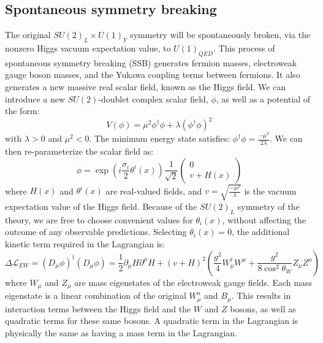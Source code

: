 \subsection{Spontaneous symmetry breaking}\label{subsec:ew_higgs}

The original $SU(2)_{L}\times U(1)_Y$ symmetry will be spontaneously broken, via the nonzero Higgs vacuum expectation value, to $U(1)_{QED}$.
This process of spontaneous symmetry breaking (SSB) generates fermion masses, electroweak gauge boson masses,
and the Yukawa coupling terms between fermions.
It also generates a new massive real scalar field, known as the Higgs field.
We can introduce a new $SU(2)$-doublet complex scalar field, $\phi$, as well as a potential of the form:
\begin{equation}\label{eq:higgs_potential}
    V(\phi) = \mu^2 \phi^\dagger\phi + \lambda(\phi^\dagger\phi)^2
\end{equation}
with $\lambda > 0$ and $\mu^2 <0$.
The minimum energy state satisfies: $\phi^\dagger\phi = \frac{-\mu^2}{2\lambda}$.
We can then re-parameterize the scalar field as:
\begin{equation}\label{eq:higgs_param}
    \phi = \exp{\left(i\frac{\sigma_i}{2}\theta^i(x)\right)}\frac{1}{\sqrt{2}}\begin{pmatrix} 0 \\ v+H(x) \end{pmatrix}
\end{equation}
where $H(x)$ and $\theta^i(x)$ are real-valued fields, and $v = \sqrt{\frac{-\mu^2}{\lambda}}$ is the vacuum expectation value of the Higgs field.
Because of the $SU(2)_L$ symmetry of the theory, we are free to choose convenient values for $\theta_i(x)$,
without affecting the outcome of any observable predictions.
Selecting $\theta_i(x) = 0$, the additional kinetic term required in the Lagrangian is:
\begin{equation}\label{eq:higgs_kinetic}
    \Delta\mathcal{L}_{EW} = \left(D_{\mu}\phi\right)^{\dagger}\left(D_{\mu}\phi\right)
    =\frac{1}{2}\partial_{\mu}H \partial^{\mu}H + (v+H)^{2}\left(\frac{g^2}{4}W_\mu^\dagger W^\mu
    + \frac{g^2}{8\cos^2 {\theta_W}}Z_\mu Z^\mu\right)
\end{equation}
where $W_\mu$ and $Z_\mu$ are mass eigenstates of the electroweak gauge fields.
Each mass eigenstate is a linear combination of the original $W_\mu^a$ and $B_\mu$.
This results in interaction terms between the Higgs field and the $W$ and $Z$ bosons, as well as quadratic terms for these same bosons.
A quadratic term in the Lagrangian is physically the same as having a mass term in the Lagrangian.
